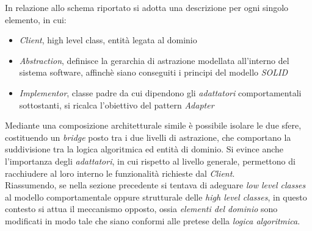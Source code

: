 \documentclass{article}
\begin{document}
In relazione allo schema riportato si adotta una descrizione per ogni singolo elemento, in cui:
\begin{itemize}[label={-}]
    \itemsep0em
    \item \textit{Client}, high level class, entità legata al dominio
    \item \textit{Abstraction}, definisce la gerarchia di astrazione modellata all'interno del sistema software, affinchè siano conseguiti i principi del modello \textit{SOLID}
    \item \textit{Implementor}, classe padre da cui dipendono gli \textit{adattatori} comportamentali sottostanti, si ricalca l'obiettivo del pattern \textit{Adapter}
\end{itemize}
Mediante una composizione architetturale simile è possibile isolare le due sfere, costituendo un \textit{bridge} posto tra i due livelli di astrazione, che comportano la suddivisione tra la logica algoritmica ed entità di dominio. Si evince anche l'importanza degli \textit{adattatori}, in cui rispetto al livello generale, permettono di racchiudere al loro interno le funzionalità richieste dal \textit{Client}.\vspace*{7pt}\\
Riassumendo, se nella sezione precedente si tentava di adeguare \textit{low level classes} al modello comportamentale oppure strutturale delle \textit{high level classes}, in questo contesto si attua il meccanismo opposto, ossia \textit{elementi del dominio} sono modificati in modo tale che siano conformi alle pretese della \textit{logica algoritmica}.
\end{document}
